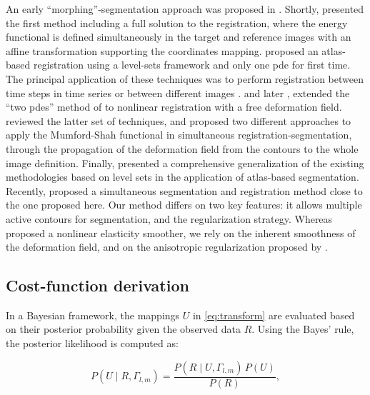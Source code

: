 An early ``morphing''-segmentation approach was proposed in \citep{bertalmio_morphing_2000}.
Shortly, \cite{yezzi_variational_2001} presented the first method including a full solution to
  the registration, where the energy functional is defined simultaneously in the target
  and reference images with an affine transformation supporting the coordinates mapping.
\cite{vemuri_joint_2003} proposed an atlas-based registration using a level-sets
  framework and only one \gls*{pde} for first time.
The principal application of these techniques was to perform registration between time steps in
  time series or between different images \citep{paragios_level_2003}.
\cite{unal_coupled_2005} and later \cite{wang_joint_2006},
  extended the ``two \glspl*{pde}'' method of \cite{yezzi_variational_2001}
  to nonlinear registration with a free deformation field.
\cite{droske_mumfordshah_2009} reviewed the latter set of techniques, and proposed two different
  approaches to apply the Mumford-Shah functional \citep{mumford_optimal_1989} in simultaneous
  registration-segmentation, through the propagation of the deformation field from
  the contours to the whole image definition.
Finally, \cite{gorthi_active_2011} presented a comprehensive generalization of the
  existing methodologies based on level sets in the application of atlas-based segmentation.
Recently, \cite{guyader_combined_2011} proposed a simultaneous segmentation and
  registration method close to the one proposed here.
Our method differs on two key features:
  it allows multiple active contours for segmentation, and the regularization strategy.
Whereas \cite{guyader_combined_2011} proposed a nonlinear elasticity smoother, we rely on
  the inherent smoothness of the deformation field, and on the anisotropic regularization
  proposed by \cite{nagel_investigation_1986}.


\subsection*{Cost-function derivation}\label{sec:methods_map}

In a Bayesian framework, the mappings $U$ in \eqref{eq:transform} are
  evaluated based on their posterior probability given the observed data
  $R$.
Using the Bayes' rule, the posterior likelihood is computed as:

  \begin{equation}
  P(U \mid R,\Gamma_{l,m}) = \frac{P(R \mid U,\Gamma_{l,m})\, P(U)}{P(R)},
  \label{eq:bayes_rule}
  \end{equation}

